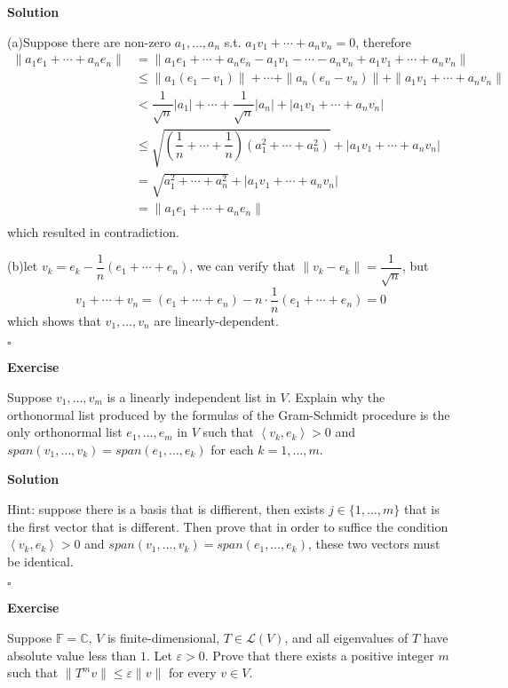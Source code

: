\documentclass{article}
\newenvironment{exercise}{%
{\textbf{Exercise\\}
    }
}{
}
\newenvironment{solution}{%
{
    \textbf{Solution\\}
    }
}{
  \hfill $\square$ 
  \par\bigskip 
}
\newcommand{\CC}{\mathbb{C}}
\newcommand{\FF}{\mathbb{F}}
\newcommand{\parameter}[1]{\left(#1\right)}
\begin{document}
\begin{CJK}{UTF8}{gkai}
\begin{solution}
    (a)Suppose there are non-zero $a_1,\ldots,a_n$ s.t. $a_1 v_1 + \cdots + a_n v_n = 0$, therefore
    \begin{align*}
    \|a_1e_1 + \cdots + a_ne_n\| &= \|a_1e_1 + \cdots + a_ne_n - a_1v_1 - \cdots - a_nv_n + a_1v_1 + \cdots + a_nv_n\| \\
    &\leq \|a_1(e_1 - v_1)\| + \cdots + \|a_n(e_n - v_n)\| + \|a_1v_1 + \cdots + a_nv_n\| \\
    &< \dfrac{1}{\sqrt{n}}|a_1| + \cdots + \dfrac{1}{\sqrt{n}}|a_n| + |a_1v_1 + \cdots + a_nv_n| \\
    &\leq \sqrt{\parameter{\dfrac{1}{n} + \cdots + \dfrac{1}{n}}(a_1^2 + \cdots + a_n^2)}+ |a_1v_1 + \cdots + a_nv_n| \\
    &= \sqrt{a_1^2 + \cdots + a_n^2} + |a_1v_1 + \cdots + a_nv_n|\\
    &= \|a_1e_1 + \cdots + a_ne_n\|\\
    \end{align*}
    which resulted in contradiction.

    (b)let $v_k = e_k - \dfrac{1}{n}(e_1 + \cdots + e_n)$, we can verify that $\|v_k - e_k\| = \dfrac{1}{\sqrt{n}}$, but
    \[v_1 + \cdots + v_n = (e_1 + \cdots + e_n) - n \cdot \dfrac{1}{n}  (e_1 + \cdots + e_n) = 0\]
    which shows that $v_1,\ldots,v_n$ are linearly-dependent.
\end{solution}


\begin{exercise}
    Suppose $v_1,\ldots,v_m$ is a linearly independent list in $V$. Explain why the orthonormal list produced by the formulas of the Gram-Schmidt procedure is the only orthonormal list $e_1,\ldots,e_m$ in $V$ such that $\left<v_k,e_k\right> > 0$ and $span(v_1,\ldots,v_k) = span(e_1,\ldots,e_k)$ for each $k = 1,\ldots,m$.
\end{exercise}

\begin{solution}
    Hint: suppose there is a basis that is diffierent, then exists $j \in \{1,\ldots,m\}$ that is the first vector that is different. Then prove that in order to suffice the condition $\left<v_k,e_k\right> > 0$ and $span(v_1,\ldots,v_k) = span(e_1,\ldots,e_k)$, these two vectors must be identical. 
\end{solution}

\begin{exercise}
    Suppose $\FF = \CC$, $V$ is finite-dimensional, $T \in \mathcal{L}(V)$, and all eigenvalues of $T$ have absolute value less than $1$. Let $\varepsilon > 0$. Prove that there exists a positive integer $m$ such that $\|T^m v\| \leq \varepsilon\|v\|$ for every $v \in V$.   
\end{exercise} 
    

\end{CJK}
\end{document}
